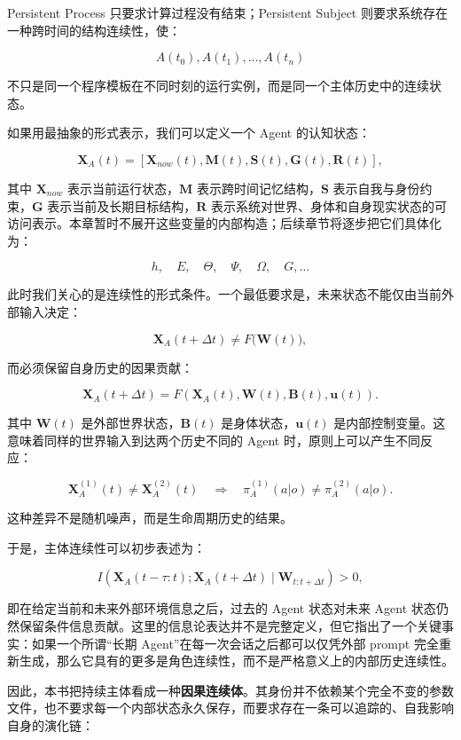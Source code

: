 Persistent Process 只要求计算过程没有结束；Persistent Subject 则要求系统存在一种跨时间的结构连续性，使：

\[
A(t_0),A(t_1),\ldots,A(t_n)
\]

不只是同一个程序模板在不同时刻的运行实例，而是同一个主体历史中的连续状态。

如果用最抽象的形式表示，我们可以定义一个 Agent 的认知状态：

\[
\mathbf{X}_A(t)
=
\left[
\mathbf{X}_{now}(t),
\mathbf{M}(t),
\mathbf{S}(t),
\mathbf{G}(t),
\mathbf{R}(t)
\right],
\]

其中 $\mathbf{X}_{now}$ 表示当前运行状态，$\mathbf{M}$ 表示跨时间记忆结构，$\mathbf{S}$ 表示自我与身份约束，$\mathbf{G}$ 表示当前及长期目标结构，$\mathbf{R}$ 表示系统对世界、身体和自身现实状态的可访问表示。本章暂时不展开这些变量的内部构造；后续章节将逐步把它们具体化为：

\[
h,\quad E,\quad \Theta,\quad \Psi,\quad \Omega,\quad G,\ldots
\]

此时我们关心的是连续性的形式条件。一个最低要求是，未来状态不能仅由当前外部输入决定：

\[
\mathbf{X}_A(t+\Delta t)
\neq
F\big(
\mathbf{W}(t)
\big),
\]

而必须保留自身历史的因果贡献：

\[
\boxed{
\mathbf{X}_A(t+\Delta t)
=
F\left(
\mathbf{X}_A(t),
\mathbf{W}(t),
\mathbf{B}(t),
\mathbf{u}(t)
\right).
}
\]

其中 $\mathbf{W}(t)$ 是外部世界状态，$\mathbf{B}(t)$ 是身体状态，$\mathbf{u}(t)$ 是内部控制变量。这意味着同样的世界输入到达两个历史不同的 Agent 时，原则上可以产生不同反应：

\[
\mathbf{X}_A^{(1)}(t)\neq
\mathbf{X}_A^{(2)}(t)
\quad\Longrightarrow\quad
\pi_A^{(1)}(a|o)
\neq
\pi_A^{(2)}(a|o).
\]

这种差异不是随机噪声，而是生命周期历史的结果。

于是，主体连续性可以初步表述为：

\[
\boxed{
I(
\mathbf{X}_A(t-\tau:t);
\mathbf{X}_A(t+\Delta t)
\mid
\mathbf{W}_{t:t+\Delta t}
)>0,
}
\]

即在给定当前和未来外部环境信息之后，过去的 Agent 状态对未来 Agent 状态仍然保留条件信息贡献。这里的信息论表达并不是完整定义，但它指出了一个关键事实：如果一个所谓“长期 Agent”在每一次会话之后都可以仅凭外部 prompt 完全重新生成，那么它具有的更多是角色连续性，而不是严格意义上的内部历史连续性。

因此，本书把持续主体看成一种\textbf{因果连续体}。其身份并不依赖某个完全不变的参数文件，也不要求每一个内部状态永久保存，而要求存在一条可以追踪的、自我影响自身的演化链：

